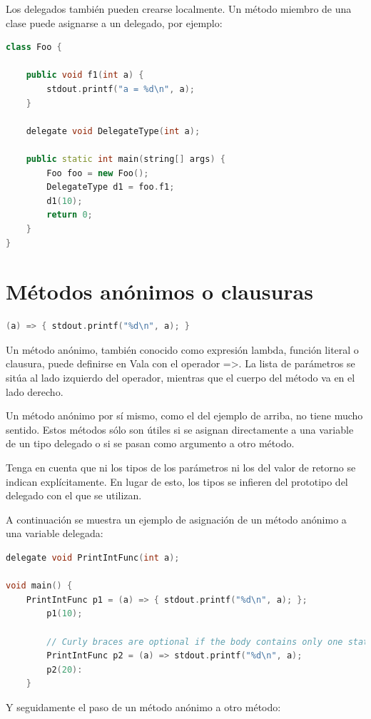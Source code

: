\documentclass[12pt,twoside]{book}
\begin{document}
Los delegados también pueden crearse localmente. Un método miembro de una clase puede asignarse a un delegado, por ejemplo:


\begin{lstlisting}[language=C++]
class Foo {
	
	public void f1(int a) {
		stdout.printf("a = %d\n", a);
	}
	
	delegate void DelegateType(int a);
	
	public static int main(string[] args) {
		Foo foo = new Foo();
		DelegateType d1 = foo.f1;
		d1(10);
		return 0;
	}
}
\end{lstlisting}

\section{Métodos anónimos o clausuras}

\begin{lstlisting}[language=C++]
(a) => { stdout.printf("%d\n", a); }
\end{lstlisting}

Un método anónimo, también conocido como expresión lambda, función literal o clausura, puede definirse en Vala con el operador =>. La lista de parámetros se sitúa al lado izquierdo del operador, mientras que el cuerpo del método va en el lado derecho.

Un método anónimo por sí mismo, como el del ejemplo de arriba, no tiene mucho sentido. Estos métodos sólo son útiles si se asignan directamente a una variable de un tipo delegado o si se pasan como argumento a otro método.

Tenga en cuenta que ni los tipos de los parámetros ni los del valor de retorno se indican explícitamente. En lugar de esto, los tipos se infieren del prototipo del delegado con el que se utilizan.

A continuación se muestra un ejemplo de asignación de un método anónimo a una variable delegada:

\begin{lstlisting}[language=C++]
delegate void PrintIntFunc(int a);

void main() {
	PrintIntFunc p1 = (a) => { stdout.printf("%d\n", a); };
		p1(10);
		
		// Curly braces are optional if the body contains only one statement:
		PrintIntFunc p2 = (a) => stdout.printf("%d\n", a);
		p2(20):
	}
\end{lstlisting}

Y seguidamente el paso de un método anónimo a otro método:
\end{document}
